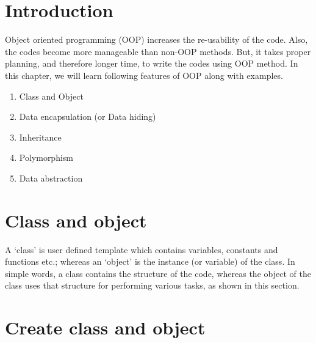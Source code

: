 \section{Introduction}

Object oriented programming (OOP) increases the re-usability of the code. Also, the codes
become more manageable than non-OOP methods. But, it takes proper planning, and therefore
longer time, to write the codes using OOP method. In this chapter, we will learn following features of OOP along with examples.

\begin{enumerate}
	\item Class and Object
	\item Data encapsulation (or Data hiding)
	\item Inheritance
	\item Polymorphism
	\item Data abstraction


\end{enumerate}

\section{Class and object}
A `class' is user defined template which contains variables, constants and functions etc.; whereas an `object' is the instance (or variable) of the class. In simple words, a class contains the structure of the code, whereas the object of the class uses that structure for performing various tasks, as shown in this section.

\section{Create class and object}
